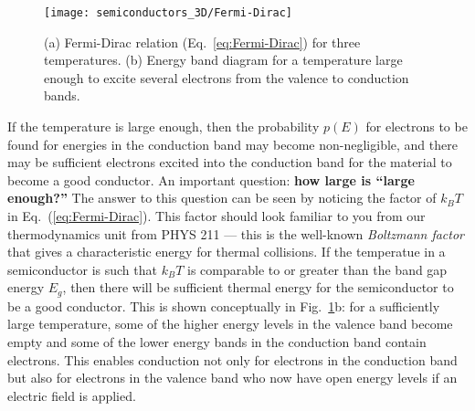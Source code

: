 \begin{figure}
\begin{center}
\texttt{[image: semiconductors\_3D/Fermi-Dirac]}
\end{center} 
\caption{(a) Fermi-Dirac relation (Eq.~\ref{eq:Fermi-Dirac}) for
three temperatures. (b) Energy band diagram for a temperature large
enough to excite several electrons from the valence to conduction bands.} 
\label{fig:Fermi-Dirac} 
\end{figure}

If the temperature is large enough, then the probability $p(E)$ for electrons
to be found for energies in the conduction band 
may become non-negligible, and there may be sufficient electrons
excited into the conduction band for the material to become a good conductor.
An important question:  {\bf how large is ``large enough?''} The answer
to this question can be seen by noticing the factor of $k_BT$
in Eq.~(\ref{eq:Fermi-Dirac}). This factor should look familiar to you
from our thermodynamics unit from PHYS 211 --- this is the well-known
{\it Boltzmann factor} that gives a characteristic energy for thermal
collisions.  If the temperatue in a semiconductor is such that $k_BT$ is
comparable to or greater than the band gap energy $E_g$, then there will
be sufficient thermal energy for the semiconductor to be a 
good conductor. This is shown conceptually in Fig.~\ref{fig:Fermi-Dirac}b: for 
a sufficiently large temperature, some of the higher energy levels in the
valence band become empty and some of the lower energy bands in the conduction
band contain electrons. This enables conduction not only for electrons
in the conduction band but also for electrons in the valence band who now
have open energy levels if an electric field is applied.


